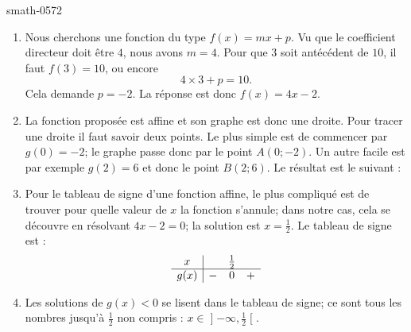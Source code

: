 
\begin{corrige}{smath-0572}

    \begin{enumerate}
        \item
            Nous cherchons une fonction du type \( f(x)=mx+p\). Vu que le coefficient directeur doit être \( 4\), nous avons \( m=4\). Pour que \( 3\) soit antécédent de \( 10\), il faut \( f(3)=10\), ou encore
            \begin{equation}
                4\times 3+p=10.
            \end{equation}
            Cela demande \( p=-2\). La réponse est donc \( f(x)=4x-2\).
        \item
            La fonction proposée est affine et son graphe est donc une droite. Pour tracer une droite il faut savoir deux points. Le plus simple est de commencer par \( g(0)=-2\); le graphe passe donc par le point \( A(0;-2)\). Un autre facile est par exemple \( g(2)=6\) et donc le point \( B(2;6)\). Le résultat est le suivant :
\begin{center}
   
\end{center}

        \item

            Pour le tableau de signe d'une fonction affine, le plus compliqué est de trouver pour quelle valeur de \( x\) la fonction s'annule; dans notre cas, cela se découvre en résolvant \( 4x-2=0\); la solution est \( x=\frac{ 1 }{2}\). Le tableau de signe est :
                \begin{equation*}
                    \begin{array}[]{c|ccc}
                        x&&\frac{ 1 }{2}&\\
                          \hline
                          g(x)&-&0&+\\ 
                           \end{array}
                       \end{equation*}

                   \item

                       Les solutions de \( g(x)<0\) se lisent dans le tableau de signe; ce sont tous les nombres jusqu'à \( \frac{ 1 }{2}\) non compris : \( x\in\mathopen] -\infty , \frac{ 1 }{2} \mathclose[\).
            
    \end{enumerate}

\end{corrige}
